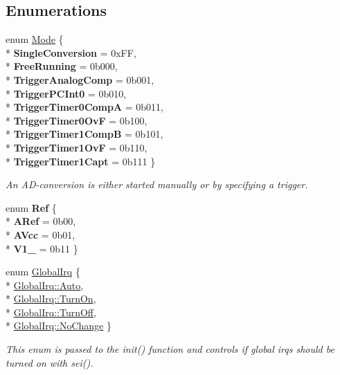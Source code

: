 \subsection*{Enumerations}
\begin{DoxyCompactItemize}
\item 
enum \hyperlink{namespaceadc_a8094fa55ea1a7729bb35c230163c0f8f}{Mode} \{ \\*
{\bfseries Single\+Conversion} = 0x\+FF, 
\\*
{\bfseries Free\+Running} = 0b000, 
\\*
{\bfseries Trigger\+Analog\+Comp} = 0b001, 
\\*
{\bfseries Trigger\+P\+C\+Int0} = 0b010, 
\\*
{\bfseries Trigger\+Timer0\+CompA} = 0b011, 
\\*
{\bfseries Trigger\+Timer0\+OvF} = 0b100, 
\\*
{\bfseries Trigger\+Timer1\+CompB} = 0b101, 
\\*
{\bfseries Trigger\+Timer1\+OvF} = 0b110, 
\\*
{\bfseries Trigger\+Timer1\+Capt} = 0b111
 \}\begin{DoxyCompactList}\small\item\em An A\+D-\/conversion is either started manually or by specifying a trigger. \end{DoxyCompactList}
\item 
enum {\bfseries Ref} \{ \\*
{\bfseries A\+Ref} = 0b00, 
\\*
{\bfseries A\+Vcc} = 0b01, 
\\*
{\bfseries V1\+\_} = 0b11
 \}\hypertarget{namespaceadc_adcbc814e47ddcec8104b574b02228d97}{}\label{namespaceadc_adcbc814e47ddcec8104b574b02228d97}

\item 
enum \hyperlink{namespaceadc_a92c3b192926a98ab7106f26c73bf85bb}{Global\+Irq} \{ \\*
\hyperlink{namespaceadc_a92c3b192926a98ab7106f26c73bf85bba06b9281e396db002010bde1de57262eb}{Global\+Irq\+::\+Auto}, 
\\*
\hyperlink{namespaceadc_a92c3b192926a98ab7106f26c73bf85bbace5a9f99f26d20a3bb29810a8716ae11}{Global\+Irq\+::\+Turn\+On}, 
\\*
\hyperlink{namespaceadc_a92c3b192926a98ab7106f26c73bf85bbaf0635e226d94e6a8339e6f237c2b6f1b}{Global\+Irq\+::\+Turn\+Off}, 
\\*
\hyperlink{namespaceadc_a92c3b192926a98ab7106f26c73bf85bba4bac8cdf0a968472b519b3b295d0d48b}{Global\+Irq\+::\+No\+Change}
 \}\begin{DoxyCompactList}\small\item\em This enum is passed to the {\ttfamily init()} function and controls if global irqs should be turned on with {\ttfamily sei()}. \end{DoxyCompactList}
\end{DoxyCompactItemize}
